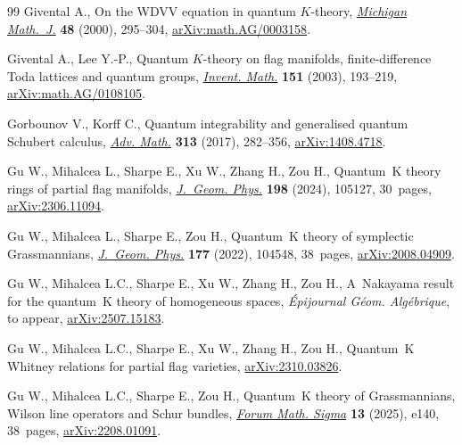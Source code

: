 \documentclass[11pt]{article}
\numberwithin{equation}{section}
\numberwithin{equation}{section}
\theoremstyle{definition}
\begin{document}
\begin{thebibliography}{99}
Givental A., On the {WDVV} equation in quantum {$K$}-theory,
 \href{https://doi.org/10.1307/mmj/1030132720}{\textit{Michigan Math.~J.}}
 \textbf{48} (2000), 295--304,
 \href{http://arxiv.org/abs/math.AG/0003158}{arXiv:math.AG/0003158}.

Givental A., Lee Y.-P., Quantum {$K$}-theory on flag manifolds,
 finite-difference {T}oda lattices and quantum groups,
 \href{https://doi.org/10.1007/s00222-002-0250-y}{\textit{Invent. Math.}}
 \textbf{151} (2003), 193--219,
 \href{http://arxiv.org/abs/math.AG/0108105}{arXiv:math.AG/0108105}.

Gorbounov V., Korff C., Quantum integrability and generalised quantum
 {S}chubert calculus,
 \href{https://doi.org/10.1016/j.aim.2017.03.030}{\textit{Adv. Math.}}
 \textbf{313} (2017), 282--356,
 \href{http://arxiv.org/abs/1408.4718}{arXiv:1408.4718}.

Gu W., Mihalcea L., Sharpe E., Xu W., Zhang H., Zou H., Quantum~{K} theory
 rings of partial flag manifolds,
 \href{https://doi.org/10.1016/j.geomphys.2024.105127}{\textit{J.~Geom.
 Phys.}} \textbf{198} (2024), 105127, 30~pages,
 \href{http://arxiv.org/abs/2306.11094}{arXiv:2306.11094}.

Gu W., Mihalcea L., Sharpe E., Zou H., Quantum~{K} theory of symplectic
 {G}rassmannians,
 \href{https://doi.org/10.1016/j.geomphys.2022.104548}{\textit{J.~Geom.
 Phys.}} \textbf{177} (2022), 104548, 38~pages,
 \href{http://arxiv.org/abs/2008.04909}{arXiv:2008.04909}.

Gu W., Mihalcea L.C., Sharpe E., Xu W., Zhang H., Zou H., A~{N}akayama result
 for the quantum~{K} theory of homogeneous spaces, \textit{\'Epijournal
 G\'eom. Alg\'ebrique}, {t}o appear,
 \href{http://arxiv.org/abs/2507.15183}{arXiv:2507.15183}.

Gu W., Mihalcea L.C., Sharpe E., Xu W., Zhang H., Zou H., Quantum~{K} {W}hitney
 relations for partial flag varieties,
 \href{http://arxiv.org/abs/2310.03826}{arXiv:2310.03826}.

Gu W., Mihalcea L.C., Sharpe E., Zou H., Quantum~{K} theory of {G}rassmannians,
 {W}ilson line operators and {S}chur bundles,
 \href{https://doi.org/10.1017/fms.2025.10088}{\textit{Forum Math. Sigma}}
 \textbf{13} (2025), e140, 38~pages,
 \href{http://arxiv.org/abs/2208.01091}{arXiv:2208.01091}.


\end{thebibliography}
\end{document}
